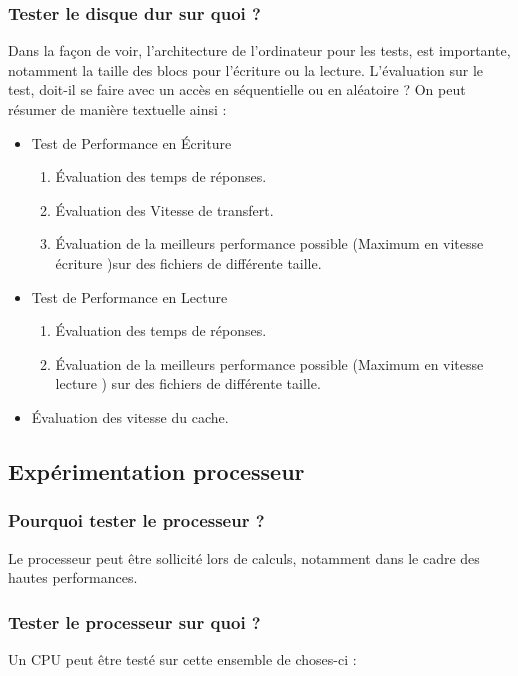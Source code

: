 \subsubsection{Tester le disque dur sur quoi ?  }
Dans la façon de voir, l'architecture de l’ordinateur pour les tests, est importante, notamment la taille des blocs pour l’écriture ou la lecture. L'évaluation sur le test, doit-il se faire avec un accès en séquentielle ou en aléatoire ?  On peut résumer de manière textuelle ainsi : 
\begin{itemize}
\item Test de Performance en Écriture 
		\begin{enumerate}
		\item Évaluation des temps de réponses. 
		\item Évaluation des Vitesse de transfert.
		\item Évaluation de la meilleurs performance possible (Maximum en vitesse écriture )sur des fichiers de différente taille.
		\end{enumerate}
\item Test de Performance en Lecture 
		\begin{enumerate}
		\item Évaluation des temps de réponses. 
		\item Évaluation de la meilleurs performance possible (Maximum en vitesse lecture ) sur des fichiers de différente taille. 
		\end{enumerate}
\item Évaluation des vitesse du cache.
\end{itemize}
\subsection{Expérimentation processeur}

\subsubsection{Pourquoi tester le processeur ? }
Le processeur peut être sollicité lors de calculs, notamment dans le cadre des hautes performances.
\subsubsection{Tester le processeur sur quoi ?  }
Un CPU peut être testé sur cette ensemble de choses-ci : 

